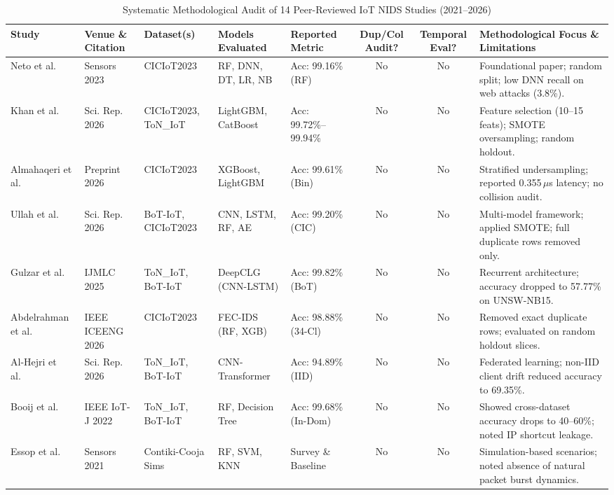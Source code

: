 \documentclass[conference,10pt,twocolumn]{IEEEtran}
\begin{document}
\begin{table}[t]
\centering
\caption{Systematic Methodological Audit of 14 Peer-Reviewed IoT NIDS Studies (2021--2026)}
\label{tab:lit_matrix}
\footnotesize
\begin{tabularx}{\textwidth}{@{}lp{3.2cm}p{2.6cm}p{2.4cm}p{2.3cm}ccp{3.2cm}@{}}
\toprule
\textbf{Study} & \textbf{Venue \& Citation} & \textbf{Dataset(s)} & \textbf{Models Evaluated} & \textbf{Reported Metric} & \textbf{Dup/Col Audit?} & \textbf{Temporal Eval?} & \textbf{Methodological Focus \& Limitations} \\ \midrule
Neto et al.~\cite{neto2023ciciot} & Sensors 2023 & CICIoT2023 & RF, DNN, DT, LR, NB & Acc: 99.16\% (RF) & No & No & Foundational paper; random split; low DNN recall on web attacks (3.8\%). \\
Khan et al.~\cite{khan2026resource} & Sci. Rep. 2026 & CICIoT2023, ToN\_IoT & LightGBM, CatBoost & Acc: 99.72\%--99.94\% & No & No & Feature selection (10--15 feats); SMOTE oversampling; random holdout. \\
Almahaqeri et al.~\cite{almahaqeri2026optimized} & Preprint 2026 & CICIoT2023 & XGBoost, LightGBM & Acc: 99.61\% (Bin) & No & No & Stratified undersampling; reported 0.355\,$\mu$s latency; no collision audit. \\
Ullah et al.~\cite{ullah2026comparative} & Sci. Rep. 2026 & BoT-IoT, CICIoT2023 & CNN, LSTM, RF, AE & Acc: 99.20\% (CIC) & No & No & Multi-model framework; applied SMOTE; full duplicate rows removed only. \\
Gulzar et al.~\cite{gulzar2025enhancing} & IJMLC 2025 & ToN\_IoT, BoT-IoT & DeepCLG (CNN-LSTM) & Acc: 99.82\% (BoT) & No & No & Recurrent architecture; accuracy dropped to 57.77\% on UNSW-NB15. \\
Abdelrahman et al.~\cite{abdelrahman2026feature} & IEEE ICEENG 2026 & CICIoT2023 & FEC-IDS (RF, XGB) & Acc: 98.88\% (34-Cl) & No & No & Removed exact duplicate rows; evaluated on random holdout slices. \\
Al-Hejri et al.~\cite{alhejri2026improving} & Sci. Rep. 2026 & ToN\_IoT, BoT-IoT & CNN-Transformer & Acc: 94.89\% (IID) & No & No & Federated learning; non-IID client drift reduced accuracy to 69.35\%. \\
Booij et al.~\cite{booij2022toniot} & IEEE IoT-J 2022 & ToN\_IoT, BoT-IoT & RF, Decision Tree & Acc: 99.68\% (In-Dom) & No & No & Showed cross-dataset accuracy drops to 40--60\%; noted IP shortcut leakage. \\
Essop et al.~\cite{essop2021dataset} & Sensors 2021 & Contiki-Cooja Sims & RF, SVM, KNN & Survey \& Baseline & No & No & Simulation-based scenarios; noted absence of natural packet burst dynamics. \\

\end{tabularx}
\end{table}
\end{document}
